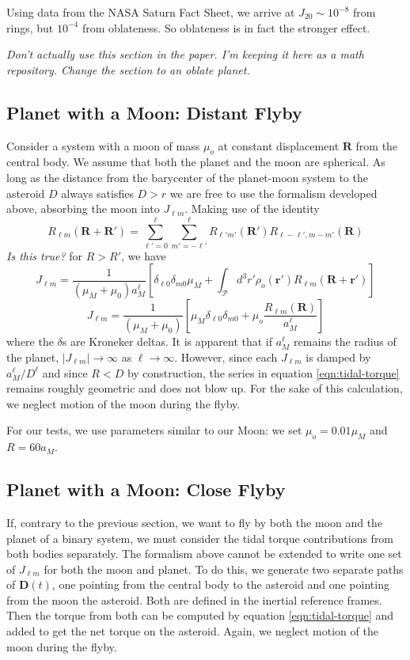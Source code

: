 \documentclass{aastex631}
\newcommand{\brackets}[1]{\left[ #1 \right]}
\newcommand{\jtd}[1]{{\color{red}\textit{#1}}}
\begin{document}
Using data from the NASA Saturn Fact Sheet, we arrive at $J_{20}\sim 10^{-8}$ from rings, but $10^{-4}$ from oblateness. So oblateness is in fact the stronger effect.

\jtd{Don't actually use this section in the paper. I'm keeping it here as a math repository. Change the section to an oblate planet.}

\subsection{Planet with a Moon: Distant Flyby}
Consider a system with a moon of mass $\mu_{o}$ at constant displacement $\bm R$ from the central body. We assume that both the planet and the moon are spherical. As long as the distance from the barycenter of the planet-moon system to the asteroid $D$ always satisfies $D>r$ we are free to use the formalism developed above, absorbing the moon into $J_{\ell m}$. Making use of the identity \cite{Gelderen1998TheSO}
\begin{equation}
R_{\ell m}(\bm R + \bm R') = \sum_{\ell' = 0}^\ell \sum_{m'=-\ell'}^\ell R_{\ell' m'}(\bm R') R_{\ell-\ell', m-m'}(\bm R)
\end{equation}
\jtd{Is this true?}
for $R > R'$, we have
\begin{equation}
J_{\ell m} = \frac{1}{(\mu_M+\mu_0) a_M^\ell}\brackets{\delta_{\ell 0}\delta_{m0}\mu_M + \int_\mathcal{P} d^3 r' \rho_o(\bm r') R_{\ell m}(\bm R + \bm r')}
\end{equation}
\begin{equation}
J_{\ell m} = \frac{1}{(\mu_M+\mu_0)}\brackets{\mu_M\delta_{\ell 0}\delta_{m0} + \mu_o \frac{R_{\ell m}(\bm R)}{ a_M^\ell}}
\end{equation}
where the $\delta$s are Kroneker deltas. It is apparent that if $a_M^\ell$ remains the radius of the planet, $|J_{\ell m}| \rightarrow \infty$ as $\ell \rightarrow \infty$. However, since each $J_{\ell m}$ is damped by $a_M^\ell / D^\ell$ and since $R < D$ by construction, the series in equation \ref{eqn:tidal-torque} remains roughly geometric and does not blow up. For the sake of this calculation, we neglect motion of the moon during the flyby.

For our tests, we use parameters similar to our Moon: we set $\mu_o = 0.01 \mu_M$ and $R = 60 a_M$.


\subsection{Planet with a Moon: Close Flyby}
If, contrary to the previous section, we want to fly by both the moon and the planet of a binary system, we must consider the tidal torque contributions from both bodies separately. The formalism above cannot be extended to write one set of $J_{\ell m}$ for both the moon and planet. To do this, we generate two separate paths of $\bm D(t)$, one pointing from the central body to the asteroid and one pointing from the moon the asteroid. Both are defined in the inertial reference frames. Then the torque from both can be computed by equation \ref{eqn:tidal-torque} and added to get the net torque on the asteroid. Again, we neglect motion of the moon during the flyby.
\end{document}
